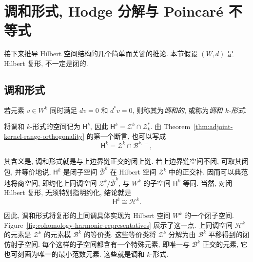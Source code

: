 \section{{调和形式, Hodge 分解与 Poincaré 不等式}}\label{sec:harmonic-hodge-poincare}

{接下来推导 Hilbert 空间结构的几个简单而关键的推论. 本节假设 $(W,d)$ 是 Hilbert 复形, 不一定是闭的.}

\subsection{{调和形式}}\label{subsec:harmonic-forms}


\begin{Definition}\label{def:harmonic-form}
{若元素 $v\in W^k$ 同时满足 $dv=0$ 和 $d^*v=0$, 则称其为\emph{调和的}, 或称为\emph{调和 $k$-形式}.}
\end{Definition}

{将调和 $k$-形式的空间记为 $\mathsf H^k$, 因此 $\mathsf H^k=\mathcal Z^k\cap\mathcal Z_k^*$. 由 Theorem~\ref{thm:adjoint-kernel-range-orthogonality} 的第一个断言, 也可以写成}
\begin{equation}\label{eq:harmonic-cocycle-orthogonality}
\mathsf H^k=\mathcal Z^k\cap\mathcal B^{k,\perp},
\end{equation}

{其含义是, 调和形式就是与上边界链正交的闭上链. 若上边界链空间不闭, 可取其闭包, 并等价地说, $\mathsf H^k$ 是闭子空间 $\overline{\mathcal B}^k$ 在 Hilbert 空间 $\mathcal Z^k$ 中的正交补. 因而可以典范地将商空间, 即约化上同调空间 $\mathcal Z^k/\overline{\mathcal B}^k$, 与 $W^k$ 的子空间 $\mathsf H^k$ 等同. 当然, 对闭 Hilbert 复形, 无须特别指明约化, 结论就是}
\begin{equation}\label{eq:harmonic-cohomology-isomorphism}
\mathsf H^k\cong\mathcal H^k.
\end{equation}

{因此, 调和形式将复形的上同调具体实现为 Hilbert 空间 $W^k$ 的一个闭子空间. Figure~\ref{fig:cohomology-harmonic-representatives} 展示了这一点. 上同调空间 $\mathcal H^k$ 的元素是 $\mathcal Z^k$ 的元素模 $\mathcal B^k$ 的等价类. 这些等价类将 $\mathcal Z^k$ 分解为由 $\mathcal B^k$ 平移得到的闭仿射子空间. 每个这样的子空间都含有一个特殊元素, 即唯一与 $\mathcal B^k$ 正交的元素, 它也可刻画为唯一的最小范数元素. 这些就是调和 $k$-形式.}

